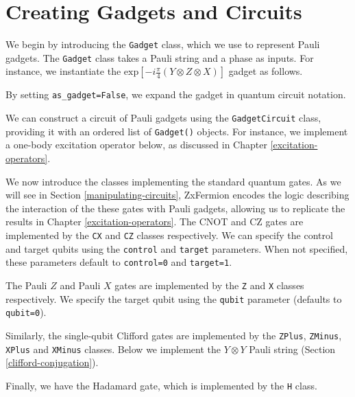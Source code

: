 \section{Creating Gadgets and Circuits}

We begin by introducing the \lstinline{Gadget} class, which we use to represent Pauli gadgets. The \lstinline{Gadget} class takes a Pauli string and a phase as inputs. For instance, we instantiate the $\text{exp} \left[ - i\frac{\pi}{4} \left(Y \otimes Z \otimes X \right) \right]$ gadget as follows.


By setting \lstinline{as_gadget=False}, we expand the gadget in quantum circuit notation.


We can construct a circuit of Pauli gadgets using the \lstinline{GadgetCircuit} class, providing it with an ordered list of \lstinline{Gadget()} objects. For instance, we implement a one-body excitation operator below, as discussed in Chapter \ref{excitation-operators}.


We now introduce the classes implementing the standard quantum gates. As we will see in Section \ref{manipulating-circuits}, ZxFermion encodes the logic describing the interaction of the these gates with Pauli gadgets, allowing us to replicate the results in Chapter \ref{excitation-operators}. The CNOT and CZ gates are implemented by the \lstinline{CX} and \lstinline{CZ} classes respectively. We can specify the control and target qubits using the \lstinline{control} and \lstinline{target} parameters. When not specified, these parameters default to \lstinline{control=0} and \lstinline{target=1}.


The Pauli $Z$ and Pauli $X$ gates are implemented by the \lstinline{Z} and \lstinline{X} classes respectively. We specify the target qubit using the \lstinline{qubit} parameter (defaults to \lstinline{qubit=0}). 


Similarly, the single-qubit Clifford gates are implemented by the \lstinline{ZPlus}, \lstinline{ZMinus}, \lstinline{XPlus} and \lstinline{XMinus} classes. Below we implement the $Y \otimes Y$ Pauli string (Section \ref{clifford-conjugation}).


Finally, we have the Hadamard gate, which is implemented by the \lstinline{H} class.

